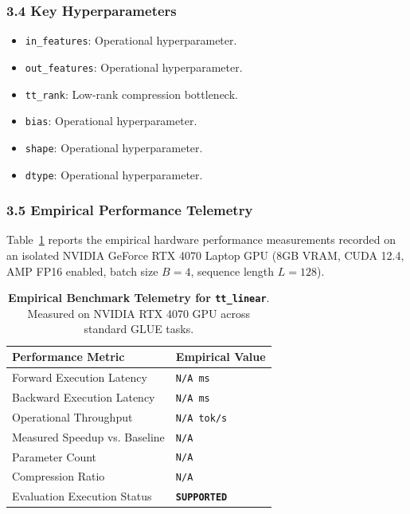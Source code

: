 \subsubsection*{3.4 Key Hyperparameters}
\begin{itemize}
    \item \texttt{in\_features}: Operational hyperparameter.
    \item \texttt{out\_features}: Operational hyperparameter.
    \item \texttt{tt\_rank}: Low-rank compression bottleneck.
    \item \texttt{bias}: Operational hyperparameter.
    \item \texttt{shape}: Operational hyperparameter.
    \item \texttt{dtype}: Operational hyperparameter.
\end{itemize}

\subsubsection*{3.5 Empirical Performance Telemetry}
Table~\ref{tab:telemetry_tt\_linear} reports the empirical hardware performance measurements recorded on an isolated NVIDIA GeForce RTX 4070 Laptop GPU (8GB VRAM, CUDA 12.4, AMP FP16 enabled, batch size $B=4$, sequence length $L=128$).

\begin{table}[h]
\centering
\small
\caption{\textbf{Empirical Benchmark Telemetry for \texttt{tt\_linear}}. Measured on NVIDIA RTX 4070 GPU across standard GLUE tasks.}
\label{tab:telemetry_tt\_linear}
\begin{tabularx}{\columnwidth}{lX}
\toprule
\textbf{Performance Metric} & \textbf{Empirical Value} \\
\midrule
Forward Execution Latency & \texttt{N/A ms} \\
Backward Execution Latency & \texttt{N/A ms} \\
Operational Throughput & \texttt{N/A tok/s} \\
Measured Speedup vs. Baseline & \texttt{N/A} \\
Parameter Count & \texttt{N/A} \\
Compression Ratio & \texttt{N/A} \\
Evaluation Execution Status & \textbf{\texttt{SUPPORTED}} \\
\bottomrule
\end{tabularx}
\end{table}

